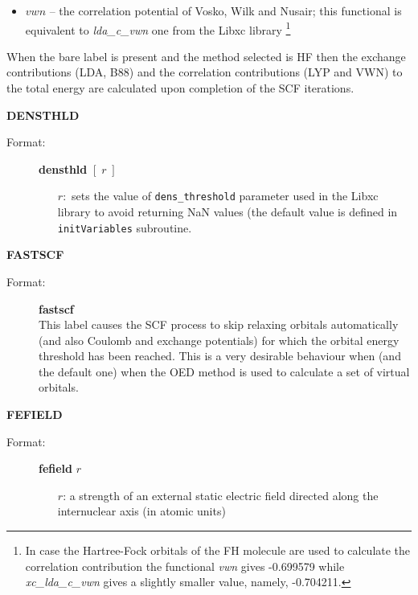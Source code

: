 \documentclass[10pt,a4paper]{article}
\newcommand{\ft}[1]{\texttt{#1}}
\begin{document}
\begin{description}
\begin{description}
\begin{itemize}
\begin{itemize}
\item $vwn$ -- the correlation potential of Vosko, Wilk and Nusair;
  this functional is equivalent to \textsl{lda\_c\_vwn} one from the Libxc library%
    \footnote{In case the Hartree-Fock orbitals of the FH molecule are used to calculate
      the correlation contribution the functional \textsl{vwn} gives -0.699579 while
      \textsl{xc\_lda\_c\_vwn} gives a slightly smaller value, namely, -0.704211.}

\end{itemize}
\end{itemize}
\end{description}
When the bare label is present and the method selected is HF then the exchange
contributions (LDA, B88) and the correlation contributions (LYP and VWN) to the total
energy are calculated upon completion of the SCF iterations.

\item \textbf{DENSTHLD}
\begin{description}
\item[Format:] \textbf{densthld}  $[\;r\;]$ \\
\begin{itemize}
\item[$r:$] sets the value of \texttt{dens\_threshold} parameter used in the
  Libxc library to avoid returning NaN values (the default value is defined in
  \ft{initVariables} subroutine.%
\end{itemize}
\end{description}

\item \textbf{FASTSCF}
\begin{description}
\item[Format:] \textbf{fastscf} \\
  This label causes the SCF process to skip relaxing orbitals automatically 
  (and also Coulomb and exchange potentials) for which the orbital energy
  threshold has been reached. This is a very desirable behaviour when
  (and the default one) when the OED method is used to calculate a set of
  virtual orbitals.
   \end{description}

\item \textbf{FEFIELD}
\begin{description}
\item[Format:] \textbf{fefield} $r$
\begin{itemize}
\item[$r$:] a strength of an external static electric field directed along
  the internuclear axis (in atomic units)
\end{itemize}
\end{description}




\end{description}
\end{document}
